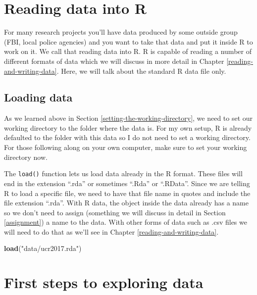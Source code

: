 \documentclass[
  12pt,
]{book}
\newenvironment{Shaded}{\begin{snugshade}}{\end{snugshade}}
\newcommand{\KeywordTok}[1]{\textcolor[rgb]{0.27,0.27,0.27}{\textbf{#1}}}
\newcommand{\NormalTok}[1]{#1}
\newcommand{\StringTok}[1]{\textcolor[rgb]{0.5,0.5,0.5}{#1}}
\begin{document}
\hypertarget{reading-data-into-r}{%
\section{Reading data into R}\label{reading-data-into-r}}

For many research projects you'll have data produced by some outside group (FBI, local police agencies) and you want to take that data and put it inside R to work on it. We call that reading data into R. R is capable of reading a number of different formats of data which we will discuss in more detail in Chapter \ref{reading-and-writing-data}. Here, we will talk about the standard R data file only.

\hypertarget{loading-data}{%
\subsection{Loading data}\label{loading-data}}

As we learned above in Section \ref{setting-the-working-directory}, we need to set our working directory to the folder where the data is. For my own setup, R is already defaulted to the folder with this data so I do not need to set a working directory. For those following along on your own computer, make sure to set your working directory now.

The \texttt{load()} function lets us load data already in the R format. These files will end in the extension ``.rda'' or sometimes ``.Rda'' or ``.RData''. Since we are telling R to load a specific file, we need to have that file name in quotes and include the file extension ``.rda''. With R data, the object inside the data already has a name so we don't need to assign (something we will discuss in detail in Section \ref{assignment}) a name to the data. With other forms of data such as .csv files we will need to do that as we'll see in Chapter \ref{reading-and-writing-data}.

\begin{Shaded}
\begin{Highlighting}[]
\KeywordTok{load}\NormalTok{(}\StringTok{"data/ucr2017.rda"}\NormalTok{)}
\end{Highlighting}
\end{Shaded}

\hypertarget{first-steps-to-exploring-data}{%
\section{First steps to exploring data}\label{first-steps-to-exploring-data}}
\end{document}
